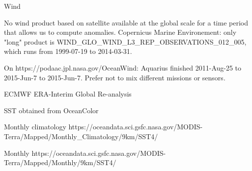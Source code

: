 Wind

No wind product based on satellite available at the global scale for a time period that allows us to compute anomalies.
Copernicus Marine Environement: only "long" product is  WIND_GLO_WIND_L3_REP_OBSERVATIONS_012_005, which runs from 1999-07-19 to 2014-03-31.

On https://podaac.jpl.nasa.gov/OceanWind: Aquarius finished 2011-Aug-25 to 2015-Jun-7 to 2015-Jun-7.
Prefer not to mix different missions or sensors.

ECMWF ERA-Interim Global Re-analysis

SST obtained from OceanColor

Monthly climatology
https://oceandata.sci.gsfc.nasa.gov/MODIS-Terra/Mapped/Monthly_Climatology/9km/SST4/

Monthly
https://oceandata.sci.gsfc.nasa.gov/MODIS-Terra/Mapped/Monthly/9km/SST4/